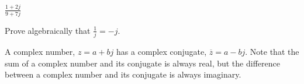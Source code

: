 \begin{enumerate}
\begin{enumerate}
\qitem $\frac{1+2j}{9+7j}$


\end{enumerate}


\qitem Prove algebraically that $\frac{1}{j} = -j$.


\end{enumerate}

A complex number, $z = a + bj$ has a complex conjugate, $\overline{z} = a - bj$.
Note that the sum of a complex number and its conjugate is always real, but the difference between a complex number and its conjugate is always imaginary.

